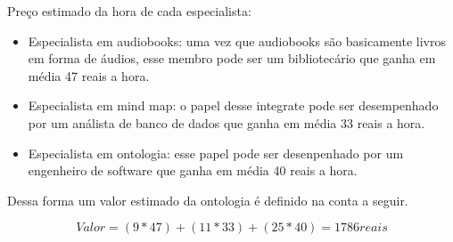 Preço estimado da hora de cada especialista: 

\begin{itemize}
	\item Especialista em audiobooks: uma vez que audiobooks são basicamente livros em forma de áudios, esse membro pode ser um bibliotecário que ganha em média 47 reais a hora. \cite{bibliotecaria}
	\item Especialista em mind map: o papel desse integrate pode ser desempenhado por um análista de banco de dados que ganha em média 33 reais a hora.\cite{profissionaisti}
	\item Especialista em ontologia: esse papel pode ser desenpenhado por um engenheiro de software que ganha em média 40 reais a hora. \cite{profissionaisti}
\end{itemize}

Dessa forma um valor estimado da ontologia é definido na conta a seguir.

\begin{equation}
Valor = (9 * 47) + (11 * 33) + (25 * 40) = 1786 reais
\end{equation} 




